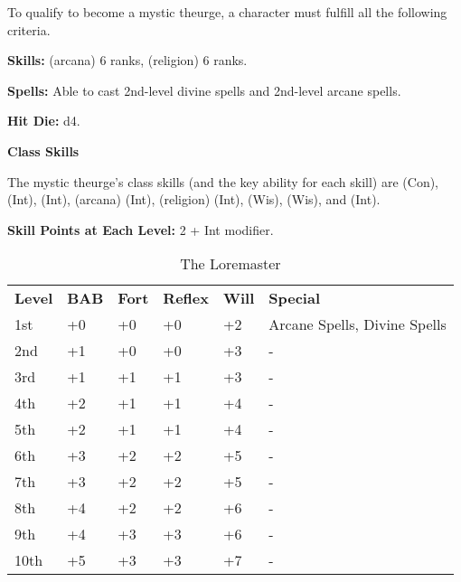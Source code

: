 
\Requirements

To qualify to become a mystic theurge, a character must fulfill all the following 
criteria.

\textbf{Skills:}  (arcana) 6 ranks,  (religion) 6 ranks.

\textbf{Spells:} Able to cast 2nd-level divine spells and 2nd-level arcane spells.

\Basics

\textbf{Hit Die:} d4.

\textbf{Class Skills}

The mystic theurge's class skills (and the key ability for each skill) are  
(Con),  (Int),  (Int),  (arcana) (Int),  
(religion) (Int),  (Wis),  (Wis), and  (Int). 

\textbf{Skill Points at Each Level:} 2 + Int modifier.

\begin{table}[htb]
\caption{The Loremaster}
\centering
\begin{tabular}{*{6}{l}}
\textbf{Level} & \textbf{BAB} & \textbf{Fort} & \textbf{Reflex} & \textbf{Will} & \textbf{Special}\\
1st & +0 & +0 & +0 & +2 & Arcane Spells, Divine Spells\\
2nd & +1 & +0 & +0 & +3 & -\\
3rd & +1 & +1 & +1 & +3 & -\\
4th & +2 & +1 & +1 & +4 & -\\
5th & +2 & +1 & +1 & +4 & -\\
6th & +3 & +2 & +2 & +5 & -\\
7th & +3 & +2 & +2 & +5 & -\\
8th & +4 & +2 & +2 & +6 & -\\
9th & +4 & +3 & +3 & +6 & -\\
10th & +5 & +3 & +3 & +7 & -\\
\end{tabular}
\end{table}

\ClassFeatures

